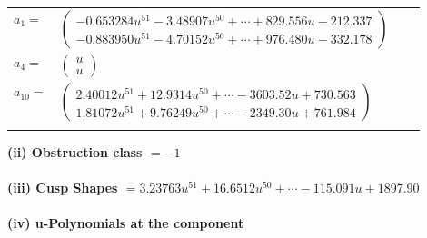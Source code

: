 \documentclass[1p]{elsarticle_modified}
\theoremstyle{definition}
\begin{document}
\begin{tabular}{m{7pt} m{180pt} m{7pt} m{180pt} }
\flushright $a_{1}=$&$\begin{pmatrix}-0.653284 u^{51}-3.48907 u^{50}+\cdots+829.556 u-212.337\\-0.883950 u^{51}-4.70152 u^{50}+\cdots+976.480 u-332.178\end{pmatrix}$ \\
\flushright $a_{4}=$&$\begin{pmatrix}u\\u\end{pmatrix}$ \\
\flushright $a_{10}=$&$\begin{pmatrix}2.40012 u^{51}+12.9314 u^{50}+\cdots-3603.52 u+730.563\\1.81072 u^{51}+9.76249 u^{50}+\cdots-2349.30 u+761.984\end{pmatrix}$\\&\end{tabular}
\flushleft \textbf{(ii) Obstruction class $= -1$}\\~\\
\flushleft \textbf{(iii) Cusp Shapes $= 3.23763 u^{51}+16.6512 u^{50}+\cdots-115.091 u+1897.90$}\\~\\
\newpage\renewcommand{\arraystretch}{1}
\flushleft \textbf{(iv) u-Polynomials at the component}\newline \\
\end{document}
